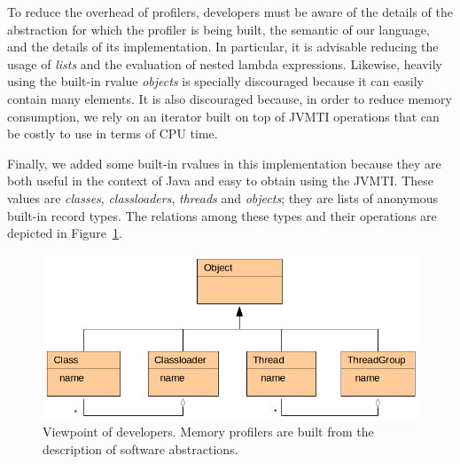 To reduce the overhead of profilers, developers must be aware of the details of the abstraction for which the profiler is being built, the semantic of our language, and the details of its implementation.
In particular, it is advisable reducing the usage of \textit{lists} and the evaluation of nested lambda expressions.
Likewise, heavily using the built-in rvalue \textit{objects} is specially discouraged because it can easily contain many elements.
It is also discouraged because, in order to reduce memory consumption, we rely on an iterator built on top of JVMTI operations that can be costly to use in terms of CPU time.

Finally, we added some built-in rvalues in this implementation because they are both useful in the context of Java and easy to obtain using the JVMTI.
These values are \textit{classes}, \textit{classloaders}, \textit{threads} and \textit{objects}; they are lists of anonymous built-in record types.
The relations among these types and their operations are depicted in Figure~\ref{fig:dsl-built-in-types}.

\begin{figure}
\centering
\includegraphics[scale=0.45]{./chapter6/fig/diagram-classes.png}
\caption{Viewpoint of developers. Memory profilers are built from the description of software abstractions.}\label{fig:dsl-built-in-types}
\end{figure}


